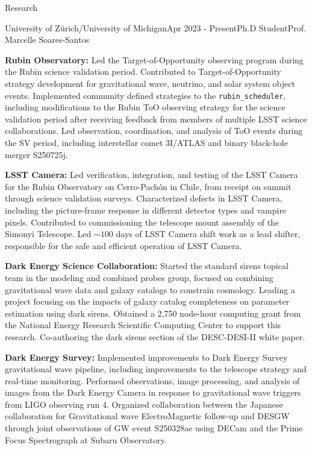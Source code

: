 \documentclass{resume} %
\begin{document}
\begin{rSection}{Research}

\begin{rSubsection}{University of Zürich/University of Michigan}{Apr 2023 - Present}{Ph.D Student}{Prof. Marcelle Soares-Santos}

    \item \textbf{Rubin Observatory:} Led the Target-of-Opportunity observing program during the Rubin science validation period. Contributed to Target-of-Opportunity strategy development for gravitational wave, neutrino, and solar system object events. Implemented community defined strategies to the \texttt{rubin\_scheduler}, including modifications to the Rubin ToO observing strategy for the science validation period after receiving feedback from members of multiple LSST science collaborations. Led observation, coordination, and analysis of ToO events during the SV period, including interstellar comet 3I/ATLAS and binary black-hole merger S250725j.
    \item \textbf{LSST Camera:} Led verification, integration, and testing of the LSST Camera for the Rubin Observatory on Cerro-Pachón in Chile, from receipt on summit through science validation surveys. Characterized defects in LSST Camera, including the picture-frame response in different detector types and vampire pixels. Contributed to commissioning the telescope mount assembly of the Simonyi Telescope. Led $\sim100$ days of LSST Camera shift work as a lead shifter, responsible for the safe and efficient operation of LSST Camera.
    \item \textbf{Dark Energy Science Collaboration:} Started the standard sirens topical team in the modeling and combined probes group, focused on combining gravitational wave data and galaxy catalogs to constrain cosmology. Leading a project focusing on the impacts of galaxy catalog completeness on parameter estimation using dark sirens. Obtained a 2,750 node-hour computing grant from the National Energy Research Scientific Computing Center to support this research. Co-authoring the dark sirens section of the DESC-DESI-II white paper.
     \item \textbf{Dark Energy Survey:} Implemented improvements to Dark Energy Survey gravitational wave pipeline, including improvements to the telescope strategy and real-time monitoring. Performed observations, image processing, and analysis of images from the Dark Energy Camera in response to gravitational wave triggers from LIGO observing run 4. Organized collaboration between the  Japanese collaboration for Gravitational wave ElectroMagnetic follow-up and DESGW through joint observations of GW event S250328ae using DECam and the Prime Focus Spectrograph at Subaru Observatory. 

\end{rSubsection}
\end{rSection}
\end{document}
